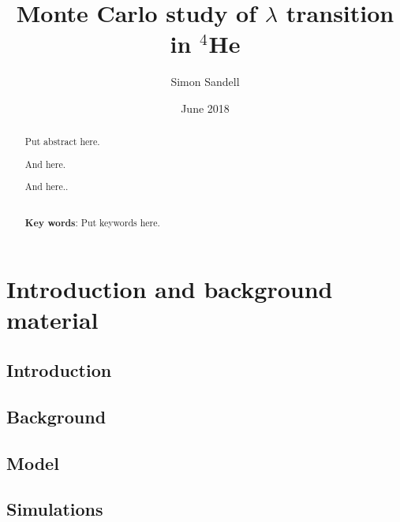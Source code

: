 \documentclass[nocoverpage,swedish,g5paper]{thesis}
\title{Monte Carlo study of $\lambda$ transition in $^{4}$He}
\author{Simon Sandell}
\date{June 2018}
\newcommand{\todo}[1]{(\textbf{TODO:} #1)}
\begin{document}

\begin{abstract}
Put abstract here.

And here.

And here..
\\\noindent \strut \\
{\bf Key words}: Put keywords here.
\end{abstract}


\begin{preface}

\end{preface}

\tableofcontents

\mainmatter

\part{Introduction and background material}

\chapter{Introduction}


\chapter{Background}\label{ch:ExtraDimensions}


\chapter{Model}\label{ch:DarkMatter}


\chapter{Simulations}\label{ch:NeutrinoPhysics}

\end{document}
